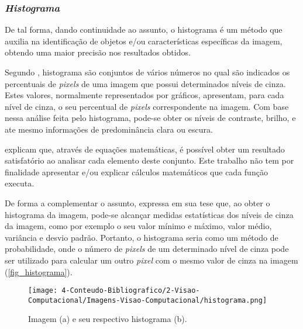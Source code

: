 \subsubsection{\textit{Histograma}}

De tal forma, dando continuidade ao assunto, o histograma é um método que auxilia na identificação de objetos e/ou características específicas da imagem, obtendo uma maior precisão nos resultados obtidos.

Segundo , histograma são conjuntos de vários números no qual são indicados os percentuais de \textit{pixels} de uma imagem que possui determinados níveis de cinza. Estes valores, normalmente representados por gráficos, apresentam, para cada nível de cinza, o seu percentual de \textit{pixels} correspondente na imagem. Com base nessa análise feita pelo histograma, pode-se obter os níveis de contraste, brilho, e ate mesmo informações de predominância clara ou escura.

 explicam que, através de equações matemáticas, é possível obter um resultado satisfatório ao analisar cada elemento deste conjunto. Este trabalho não tem por finalidade apresentar e/ou explicar cálculos matemáticos que cada função executa.

De forma a complementar o assunto,  expressa em sua tese que, ao obter o histograma da imagem, pode-se alcançar medidas estatísticas dos níveis de cinza da imagem, como por exemplo o seu valor mínimo e máximo, valor médio, variância e desvio padrão. Portanto, o histograma seria como um método de probabilidade, onde o número de \textit{pixels} de um determinado nível de cinza pode ser utilizado para calcular um outro \textit{pixel} com o mesmo valor de cinza na imagem (\autoref{fig_histograma}).

\begin{figure}[h]
	\caption{\label{fig_histograma}Imagem (a) e seu respectivo histograma (b).}
	\begin{center}
		\texttt{[image: 4-Conteudo-Bibliografico/2-Visao-Computacional/Imagens-Visao-Computacional/histograma.png]}
	\end{center}
	\centering {}
\end{figure}
